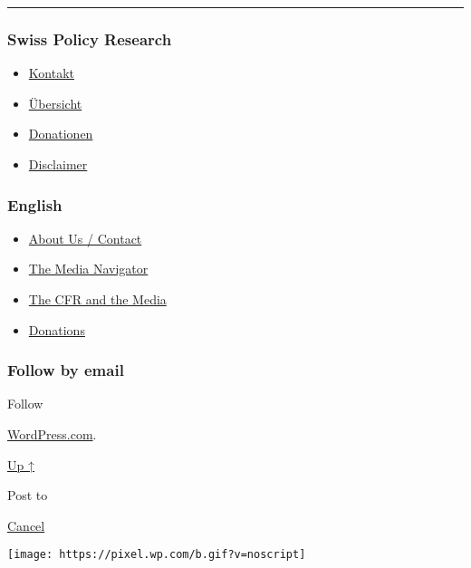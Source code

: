 \begin{center}\rule{0.5\linewidth}{\linethickness}\end{center}

\hypertarget{swiss-policy-research}{%
\subsubsection{Swiss Policy Research}\label{swiss-policy-research}}

\begin{itemize}
\tightlist
\item
  \href{https://swprs.org/kontakt/}{Kontakt}
\item
  \href{https://swprs.org/uebersicht/}{Übersicht}
\item
  \href{https://swprs.org/donationen/}{Donationen}
\item
  \href{https://swprs.org/disclaimer/}{Disclaimer}
\end{itemize}

\hypertarget{english}{%
\subsubsection{English}\label{english}}

\begin{itemize}
\tightlist
\item
  \href{https://swprs.org/contact/}{About Us / Contact}
\item
  \href{https://swprs.org/media-navigator/}{The Media Navigator}
\item
  \href{https://swprs.org/the-american-empire-and-its-media/}{The CFR
  and the Media}
\item
  \href{https://swprs.org/donations/}{Donations}
\end{itemize}

\hypertarget{follow-by-email}{%
\subsubsection{Follow by email}\label{follow-by-email}}

Follow

\href{https://wordpress.com/?ref=footer_custom_com}{WordPress.com}.

\protect\hyperlink{}{Up ↑}

Post to

\protect\hyperlink{}{Cancel}

\texttt{[image: https://pixel.wp.com/b.gif?v=noscript]}
